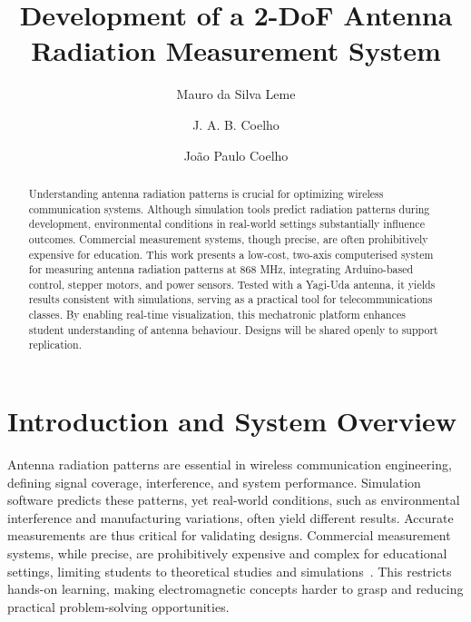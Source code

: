 \documentclass[runningheads]{llncs}
\begin{document}
%
\title{Development of a 2-DoF Antenna Radiation Measurement System}

%
%
\author{Mauro da Silva Leme \and J. A. B. Coelho \and João Paulo Coelho}

%
%
%
\maketitle             
%
\begin{abstract}
Understanding antenna radiation patterns is crucial for optimizing wireless communication systems. Although simulation tools predict radiation patterns during development, environmental conditions in real-world settings substantially influence outcomes. Commercial measurement systems, though precise, are often prohibitively expensive for education. This work presents a low-cost, two-axis computerised system for measuring antenna radiation patterns at 868 MHz, integrating Arduino-based control, stepper motors, and power sensors. Tested with a Yagi-Uda antenna, it yields results consistent with simulations, serving as a practical tool for telecommunications classes. By enabling real-time visualization, this mechatronic platform enhances student understanding of antenna behaviour. Designs will be shared openly to support replication.
\end{abstract}
%

\section{Introduction and System Overview}
Antenna radiation patterns are essential in wireless communication engineering, defining signal coverage, interference, and system performance\cite{balanis2016antenna}. Simulation software predicts these patterns, yet real-world conditions, such as environmental interference and manufacturing variations, often yield different results\cite{6157745}. Accurate measurements are thus critical for validating designs. Commercial measurement systems, while precise, are prohibitively expensive and complex for educational settings, limiting students to theoretical studies and simulations~\cite{Simanjuntak2019}. This restricts hands-on learning, making electromagnetic concepts harder to grasp and reducing practical problem-solving opportunities.
\end{document}
